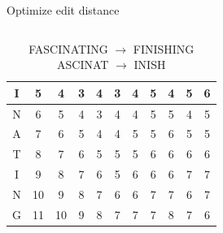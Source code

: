 \documentclass[aspectratio=1610, xcolor=table]{beamer}
\begin{document}
\begin{frame}[fragile]{Optimize edit distance}
\begin{columns}
{\begin{table}
\begin{center}
{\begin{tabular}[c]{c|c|c|c|c|c|c|c|c|c|c|}
					I & 5                    & \cellcolor{green!25}4 & \cellcolor{green!25}3 & \cellcolor{green!25}4 & \cellcolor{blue!25}3  & \cellcolor{green!25}4 & \cellcolor{green!25}5 & 4                    & 5                    & 6                    \\\hline
					N & 6                    & \cellcolor{green!25}5 & \cellcolor{green!25}4 & \cellcolor{green!25}3 & \cellcolor{green!25}4 & \cellcolor{blue!25}4  & \cellcolor{green!25}5 & 5                    & 4                    & 5                    \\\hline
					A & 7                    & \cellcolor{green!25}6 & \cellcolor{green!25}5 & \cellcolor{green!25}4 & \cellcolor{green!25}4 & \cellcolor{green!25}5 & \cellcolor{blue!25}5  & 6                    & 5                    & 5                    \\\hline
					T & 8                    & \cellcolor{green!25}7 & \cellcolor{green!25}6 & \cellcolor{green!25}5 & \cellcolor{green!25}5 & \cellcolor{green!25}5 & \cellcolor{blue!25}6  & 6                    & 6                    & 6                    \\\hline
					I & 9                    & 8                     & 7                     & 6                     & 5                     & 6                     & 6                     & \cellcolor{blue!25}6 & 7                    & 7                    \\\hline
					N & 10                   & 9                     & 8                     & 7                     & 6                     & 6                     & 7                     & 7                    & \cellcolor{blue!25}6 & 7                    \\\hline
					G & 11                   & 10                    & 9
                      & 8                     & 7                     & 7
                      & 7                     & 8                    & 7
                      & \cellcolor{blue!25}6 \\\hline\end{tabular}} \end{center}
                      \caption{FASCINATING $\rightarrow$ FINISHING \\ ASCINAT $\rightarrow$
                      INISH}
			\label{tab:minimizededitmatrix}
    \end{table}

	}
\end{columns}
\end{frame}
\end{document}
